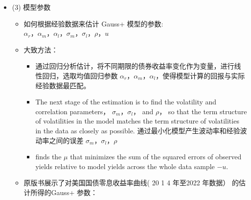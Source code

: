 \begin{itemize}
\begin{itemize}
    \item \begin{align*}
    dr_t &= -\alpha_r(m_t - r_t)dt: \text{短期利率变化没有随机波动项 (lack of a volatility term)} \\
    &\Rightarrow \text{the Gauss+ model can match empirically observed hump-shaped term structures of volatility.}
    \end{align*}
    \item The short-term rate may revert to the medium-term factor， which is meant to reflect business cycles and monetary policy factors.
    \item The medium-term factor reverts to the long-term factor， which is meant to reflect long-term expectations of inflation and the real interest rate， which ultimately depend on long-term trends in demographics， production technology， and so forth. 【中期利率会向长期利率回归，长期因素反映对通货膨胀和实际利率的长期预期，这些预期取决于人口结构、生产技术等长期趋势】
    \item And the long-term factor reverts to a constant \( \mu \). 【长期因素向常数回归】
    \item The short-term rate reverts quickly to the medium-term factor; the medium-term factor reverts more slowly to the long-term factor; and the long-term factor reverts slowest of all to its target.
    \end{itemize}


\item (3) 模型参数


    \begin{itemize}
    \item 如何根据经验数据来估计 Gauss+ 模型的参数: \( \alpha_r， \alpha_m， \alpha_l， \sigma_m， \sigma_l， \rho， u \)
    \item 大致方法：
        \begin{itemize}
        \item 通过回归分析估计，将不同期限的债券收益率变化作为变量，进行线性回归，选取均值回归参数 \( \alpha_r， \alpha_m， \alpha_l \)，使得模型计算的回报与实际经验数据最匹配。
        \item The next stage of the estimation is to find the volatility and correlation parameters， \( \sigma_m， \sigma_l， \) and \( \rho \)， so that the term structure of volatilities in the model matches the term structure of volatilities in the data as closely as possible. 通过最小化模型产生波动率和经验波动率之间的误差 \( \sigma_m， \sigma_l， \rho \) 
        \item finds the \( \mu \) that minimizes the sum of the squared errors of observed yields relative to model yields across the whole data sample \( - u \).
        \end{itemize}
    \item 原版书展示了对美国国债零息收益率曲线( 20 1 4 年至2022 年数据） 的估
        计所得的Gauss+ 参数：
    

\end{itemize}
\end{itemize}
